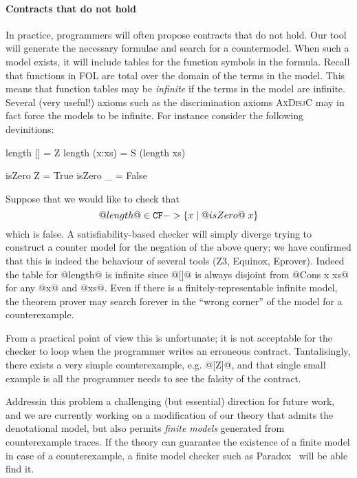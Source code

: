\paragraph{Contracts that do not hold}
\label{ssect:countersat}

In practice, programmers will often propose contracts that do not hold. Our tool 
will generate the necessary formulae and search for a countermodel. When such a model 
exists, it will include tables for the function symbols in the formula. Recall that
functions in FOL are total over the domain of the terms in the model. This means that function 
tables may be {\em infinite} if the terms in the model are infinite. Several (very useful!) 
axioms such as the discrimination axioms \textsc{AxDisjC} may in fact force the models to be 
infinite. For instance consider the following devinitions:
\begin{code}
  length [] = Z
  length (x:xs) = S (length xs)

  isZero Z = True
  isZero _ = False
\end{code}
Suppose that we would like to check that 
   \[ @length@ \in {\tt CF} -> \{ x \mid @isZero@\;x\} \]
which is false.  A satisfiability-based checker 
will simply diverge trying to construct a counter model for the negation of the above query; we 
have confirmed that this is indeed the behaviour of several tools (Z3, Equinox, Eprover).
Indeed the table for @length@ is infinite since @[]@ is always disjoint from @Cons x xs@ for 
any @x@ and @xs@. Even if there is a finitely-representable infinite model, 
the theorem prover may search forever in the ``wrong corner'' of the model for a 
counterexample. 

From a practical point of view this is unfortunate; it is not
acceptable for the checker to loop when the programmer writes an
erroneous contract.
Tantalisingly, there exists a very simple 
counterexample, e.g. @[Z]@, and that single small
example is all the programmer needs to see the falsity of the contract.

Addressin this problem a challenging (but essential) 
direction for future work, and we are currently 
working on a modification of our theory that admits the denotational model, but 
also permits {\em finite models} generated from counterexample traces.
If the theory can guarantee the existence of a finite model in case of a counterexample,
a finite model checker such as Paradox~\cite{paradox} will be able find it.

